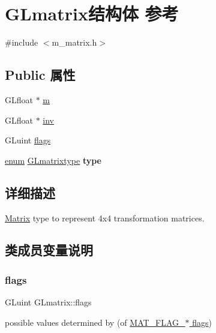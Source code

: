 \hypertarget{struct_g_lmatrix}{}\section{G\+Lmatrix结构体 参考}
\label{struct_g_lmatrix}


{\ttfamily \#include $<$m\+\_\+matrix.\+h$>$}

\subsection*{Public 属性}
\begin{DoxyCompactItemize}
\item 
G\+Lfloat $\ast$ \hyperlink{struct_g_lmatrix_aed91ed72e8180733f0deb2807bf9afc5}{m}
\item 
G\+Lfloat $\ast$ \hyperlink{struct_g_lmatrix_a9db637b7b21b2bd9b320a5b1bb6dd4ac}{inv}
\item 
G\+Luint \hyperlink{struct_g_lmatrix_a5629774e886d1741cb39dba1e4fcced5}{flags}
\item 
\mbox{\label{struct_g_lmatrix_a59493019de3795927201e72ab86dac52}} 
\hyperlink{interfaceenum}{enum} \hyperlink{m__matrix_8h_a585a59cde4d2e19df6c0844b36f0606c}{G\+Lmatrixtype} {\bfseries type}
\end{DoxyCompactItemize}


\subsection{详细描述}
\hyperlink{class_matrix}{Matrix} type to represent 4x4 transformation matrices. 

\subsection{类成员变量说明}
\mbox{\label{struct_g_lmatrix_a5629774e886d1741cb39dba1e4fcced5}} 
\subsubsection{\texorpdfstring{flags}{flags}}
{\footnotesize\ttfamily G\+Luint G\+Lmatrix\+::flags}

possible values determined by (of \hyperlink{group___mat_flags}{M\+A\+T\+\_\+\+F\+L\+A\+G\+\_\+$\ast$ flags}) \mbox{\label{struct_g_lmatrix_a9db637b7b21b2bd9b320a5b1bb6dd4ac}} 
